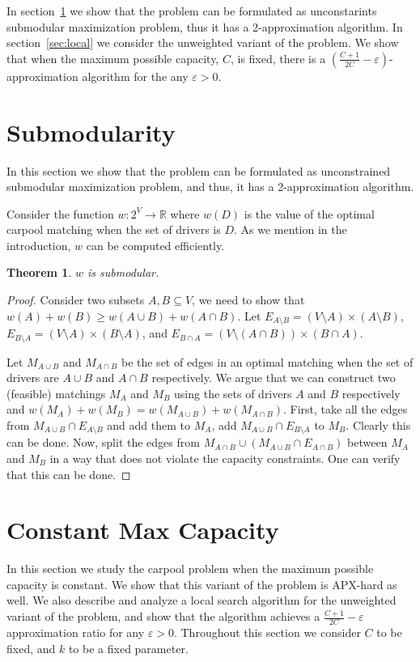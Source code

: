 \documentclass[draft]{article}
\def\R{\mathbb{R}}
\newtheorem{theorem}{Theorem}
\begin{document}
In section~\ref{sec:sub} we show that the problem can be formulated as
unconstarints submodular maximization problem, thus it has a 2-approximation
algorithm.
In section~\ref{sec:local} we consider the unweighted variant of the problem.
We show that when the maximum possible capacity, $C$, is fixed, there is a 
$(\frac{C + 1}{2C} - \varepsilon)$-approximation algorithm for the any $\varepsilon > 0$.

\section{Submodularity}
\label{sec:sub}
In this section we show that the problem can be formulated as unconstrained
submodular maximization problem, and thus, it has a 2-approximation algorithm.

Consider the function $w : 2^V \to \R$ where $w(D)$ is the value of the optimal
carpool matching when the set of drivers is $D$.
As we mention in the introduction, $w$ can be computed efficiently.

\begin{theorem}
$w$ is submodular.
\end{theorem}

\begin{proof}
Consider two subsets $A,B \subseteq V$, 
we need to show that $w(A) + w(B) \geq w(A \cup B) + w(A \cap B)$.
Let $E_{A \setminus B} = (V \setminus A) \times (A \setminus B)$, 
$E_{B \setminus A} = (V \setminus A) \times (B \setminus A)$,
and $E_{B \cap A} = (V \setminus (A \cap B)) \times (B \cap A)$.
 
Let $M_{A \cup B}$ and $M_{A \cap B}$ be the set of edges in an optimal
matching when the set of drivers are $A \cup B$ and $A \cap B$ respectively.
We argue that we can construct two (feasible) matchings $M_A$ and $M_B$ using
the sets of drivers $A$ and $B$ respectively and 
$w(M_A) + w(M_B) = w(M_{A \cup B}) + w(M_{A \cap B})$.
First, take all the edges from $M_{A \cup B} \cap E_{A \setminus B}$ and 
add them to $M_A$, 
add $M_{A \cup B} \cap E_{B \setminus A}$ to $M_B$.
Clearly this can be done.
Now, split the edges from $M_{A \cap B} \cup (M_{A \cup B} \cap E_{A \cap B})$
between $M_A$ and $M_B$ in a way that does not violate the capacity constraints.
One can verify that this can be done.
\end{proof}

\section{Constant Max Capacity}
In this section we study the carpool problem when the maximum possible capacity
is constant.
We show that this variant of the problem is APX-hard as well.
We also describe and analyze a local search algorithm for the unweighted
variant of the problem, 
and show that the algorithm achieves a 
$\frac{C + 1}{2C} - \varepsilon$ approximation ratio for any $\varepsilon > 0$.
Throughout this section we consider $C$ to be fixed, and $k$ to be a fixed parameter.  
\end{document}
